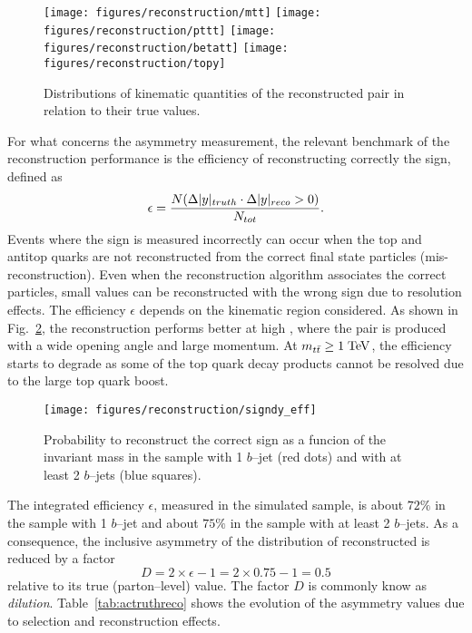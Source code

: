 \begin{figure}[!htb]\centering
  \texttt{[image: figures/reconstruction/mtt]}
  \texttt{[image: figures/reconstruction/pttt]}
  \texttt{[image: figures/reconstruction/betatt]}
  \texttt{[image: figures/reconstruction/topy]}
  \caption{
    \label{fig:reso}
    Distributions of kinematic quantities of the
    reconstructed \ttbar{} pair in relation to their true values.
  }
\end{figure} 

For what concerns the asymmetry measurement, the relevant benchmark of
the reconstruction performance is the efficiency of reconstructing
correctly the \dy{} sign, defined as
\begin{equation}
  \label{eq:dysign}
  \epsilon = \frac{N(\Delta|y|{}_{truth}\cdot\Delta|y|{}_{reco}>0)}{N_{tot}}.
\end{equation}
Events where the \dy{} sign is measured incorrectly can occur when the top and
antitop quarks are not reconstructed from the correct final
state particles (mis-reconstruction). Even when the reconstruction
algorithm associates the correct particles, small \dy{} values can be
reconstructed with the wrong sign due to resolution effects.
The efficiency $\epsilon$ depends on the kinematic region
considered. As shown in Fig.~\ref{fig:dysign}, the \dy{} reconstruction performs
better at high \mtt{}, where the \ttbar{} pair is produced with a wide
opening angle and large momentum. At $m_{t\bar{t}}{}\geq1\; \mathrm{TeV}{}$, the efficiency
starts to degrade as some of the top quark decay products cannot be
resolved due to the large top quark boost.

\begin{figure}[!htb]\centering
  \texttt{[image: figures/reconstruction/signdy\_eff]}
  \caption{
    \label{fig:dysign}
    Probability to reconstruct the correct \dy{} sign as a funcion of
    the \ttbar{} invariant mass \mtt{} in the sample with 1 $b$--jet
    (red dots) and with at least 2 $b$--jets (blue squares).
  }
\end{figure}

The integrated efficiency $\epsilon$, measured in the \ttbar{} simulated sample,
is about $72\%$ in the sample with 1 $b$--jet and about $75\%$ in the
sample with at least 2 $b$--jets. As a consequence, the inclusive
asymmetry of the distribution of reconstructed \dy{} is reduced by a factor 
\begin{equation}
  \label{eq:dilution}
D = 2\times{}\epsilon - 1=2\times0.75-1=0.5
\end{equation}
relative to its true (parton--level) value. The factor $D$ is commonly
know as {\it dilution}.
Table~\ref{tab:actruthreco} shows the evolution of the asymmetry
values due to selection and reconstruction effects. 

